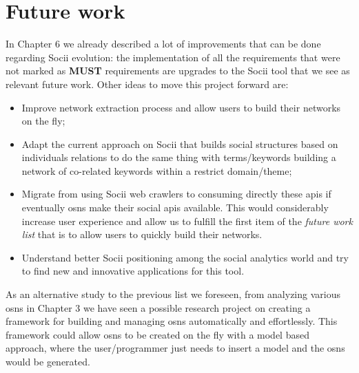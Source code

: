 \section{Future work}
In Chapter 6 we already described a lot of improvements that can be done regarding Socii evolution: the implementation of all the requirements that were not marked as \textbf{MUST} requirements are upgrades to the Socii tool that we see as relevant future work. Other ideas to move this project forward are:

\begin{itemize}
    \item Improve network extraction process and allow users to build their networks on the fly;
    \item Adapt the current approach on Socii that builds social structures based on individuals relations to do the same thing with terms/keywords
    building a network of co-related keywords within a restrict domain/theme;
    \item Migrate from using Socii web crawlers to consuming directly these \glspl{api} if eventually \glspl{osn} make their social \glspl{api} available. This would considerably increase user experience and allow us to fulfill the first item of the \textit{future work list} that is to allow users to quickly build their networks.
    \item Understand better Socii positioning among the social analytics world and try to find new and innovative applications for this tool.
\end{itemize}

As an alternative study to the previous list we foreseen, from analyzing various \glspl{osn} in Chapter 3 we have seen a possible research project on creating a framework for building and managing \glspl{osn} automatically and effortlessly. This framework could allow \glspl{osn} to be created on the fly with a model based approach, where the user/programmer just needs to insert a model and the \glspl{osn} would be generated.

